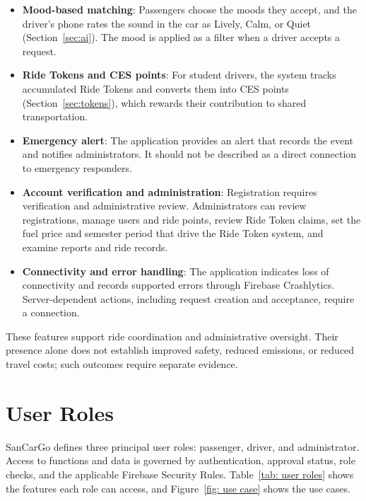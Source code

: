 \begin{itemize}
    \item \textbf{Mood-based matching}: Passengers choose the moods they accept, and the driver's phone rates the sound in the car as Lively, Calm, or Quiet (Section~\ref{sec:ai}). The mood is applied as a filter when a driver accepts a request.
    \item \textbf{Ride Tokens and CES points}: For student drivers, the system tracks accumulated Ride Tokens and converts them into CES points (Section~\ref{sec:tokens}), which rewards their contribution to shared transportation.
    \item \textbf{Emergency alert}: The application provides an alert that records the event and notifies administrators. It should not be described as a direct connection to emergency responders.
    \item \textbf{Account verification and administration}: Registration requires verification and administrative review. Administrators can review registrations, manage users and ride points, review Ride Token claims, set the fuel price and semester period that drive the Ride Token system, and examine reports and ride records.
    \item \textbf{Connectivity and error handling}: The application indicates loss of connectivity and records supported errors through Firebase Crashlytics. Server-dependent actions, including request creation and acceptance, require a connection.
\end{itemize}
These features support ride coordination and administrative oversight. Their presence alone does not establish improved safety, reduced emissions, or reduced travel costs; such outcomes require separate evidence.


\section{User Roles}

SanCarGo defines three principal user roles: passenger, driver, and administrator. Access to functions and data is governed by authentication, approval status, role checks, and the applicable Firebase Security Rules. Table~\ref{tab: user roles} shows the features each role can access, and Figure~\ref{fig: use case} shows the use cases.

